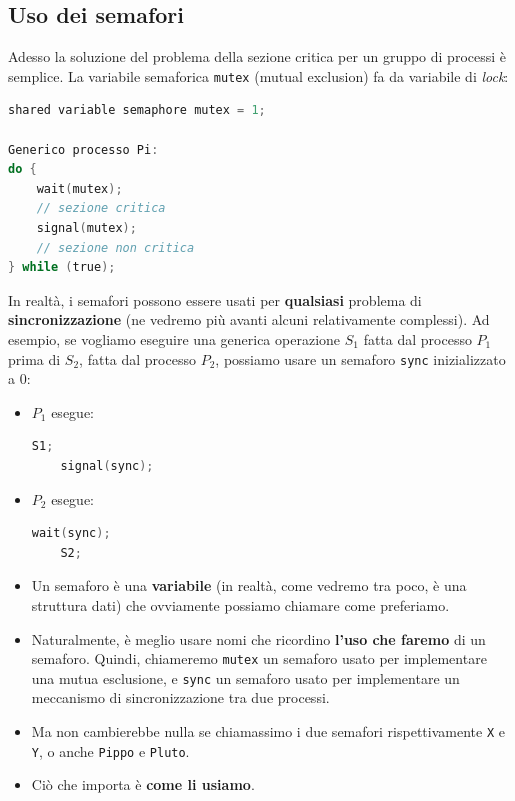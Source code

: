 \subsection{Uso dei semafori}
Adesso la soluzione del problema della sezione critica per un gruppo di processi è semplice. La variabile semaforica \texttt{mutex} (mutual exclusion) fa da variabile di \textit{lock}:

\begin{lstlisting}[language=C]
shared variable semaphore mutex = 1;

Generico processo Pi:
do {
    wait(mutex);
    // sezione critica
    signal(mutex);
    // sezione non critica
} while (true);
\end{lstlisting}
In realtà, i semafori possono essere usati per \textbf{qualsiasi} problema di \textbf{sincronizzazione} (ne vedremo più avanti alcuni relativamente complessi). 
Ad esempio, se vogliamo eseguire una generica operazione $S_1$ fatta dal processo $P_1$ prima di $S_2$, fatta dal processo $P_2$, possiamo usare un semaforo \texttt{sync} inizializzato a 0:
\begin{itemize}
    \item $P_1$ esegue:
    \begin{lstlisting}[language=C]
    S1;
    signal(sync);
    \end{lstlisting}
    \item $P_2$ esegue:
    \begin{lstlisting}[language=C]
    wait(sync);
    S2;
    \end{lstlisting}
\end{itemize}
\begin{itemize}
    \item Un semaforo è una \textbf{variabile} (in realtà, come vedremo tra poco, è una struttura dati) che ovviamente possiamo chiamare come preferiamo.
    \item Naturalmente, è meglio usare nomi che ricordino \textbf{l'uso che faremo} di un semaforo. Quindi, chiameremo \texttt{mutex} un semaforo usato per implementare una mutua esclusione, e \texttt{sync} un semaforo usato per implementare un meccanismo di sincronizzazione tra due processi.
    \item Ma non cambierebbe nulla se chiamassimo i due semafori rispettivamente \texttt{X} e \texttt{Y}, o anche \texttt{Pippo} e \texttt{Pluto}.
    \item Ciò che importa è \textbf{come li usiamo}.
\end{itemize}

